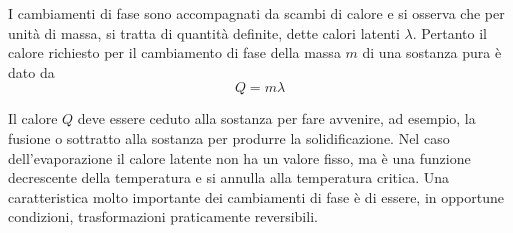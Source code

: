 \documentclass[class=book, crop=false, oneside, 12pt]{standalone}
\begin{document}
I cambiamenti di fase sono accompagnati da scambi di calore e si osserva che per unità di massa, si tratta di quantità definite, dette calori latenti \(\lambda\). 
Pertanto il calore richiesto per il cambiamento di fase della massa \(m\) di una sostanza pura è dato da
\begin{equation}
    Q = m \lambda
\end{equation}

Il calore \(Q\) deve essere ceduto alla sostanza per fare avvenire, ad esempio, la fusione o sottratto alla sostanza per produrre la solidificazione.\newline
Nel caso dell'evaporazione il calore latente non ha un valore fisso, ma è una funzione decrescente della temperatura e si annulla alla temperatura critica.\newline
Una caratteristica molto importante dei cambiamenti di fase è di essere, in opportune condizioni, trasformazioni praticamente reversibili.
\end{document}
